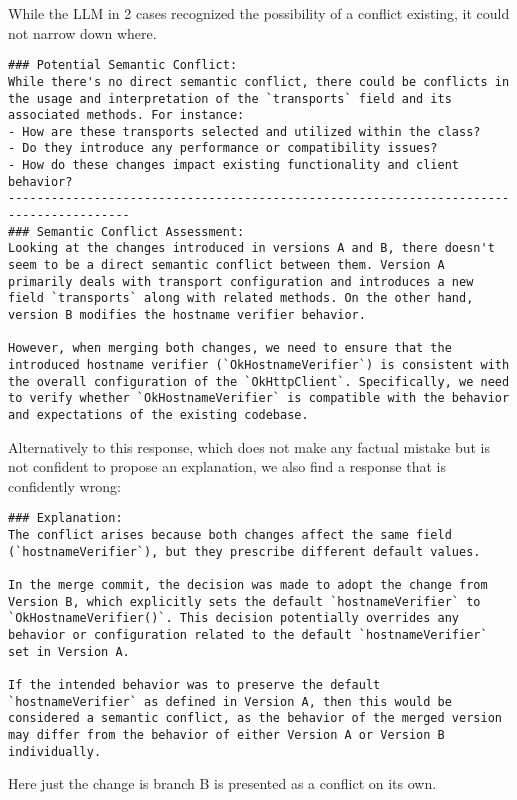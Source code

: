 While the LLM in 2 cases recognized the possibility of a conflict existing, it could not narrow down where.
\begin{lstlisting}
### Potential Semantic Conflict:
While there's no direct semantic conflict, there could be conflicts in the usage and interpretation of the `transports` field and its associated methods. For instance:
- How are these transports selected and utilized within the class?
- Do they introduce any performance or compatibility issues?
- How do these changes impact existing functionality and client behavior?
---------------------------------------------------------------------------------------
### Semantic Conflict Assessment:
Looking at the changes introduced in versions A and B, there doesn't seem to be a direct semantic conflict between them. Version A primarily deals with transport configuration and introduces a new field `transports` along with related methods. On the other hand, version B modifies the hostname verifier behavior.

However, when merging both changes, we need to ensure that the introduced hostname verifier (`OkHostnameVerifier`) is consistent with the overall configuration of the `OkHttpClient`. Specifically, we need to verify whether `OkHostnameVerifier` is compatible with the behavior and expectations of the existing codebase.
\end{lstlisting}
Alternatively to this response, which does not make any factual mistake but is not confident to propose an explanation, we also find a response that is confidently wrong:
\begin{lstlisting}
### Explanation:
The conflict arises because both changes affect the same field (`hostnameVerifier`), but they prescribe different default values.
   
In the merge commit, the decision was made to adopt the change from Version B, which explicitly sets the default `hostnameVerifier` to `OkHostnameVerifier()`. This decision potentially overrides any behavior or configuration related to the default `hostnameVerifier` set in Version A.
    
If the intended behavior was to preserve the default `hostnameVerifier` as defined in Version A, then this would be considered a semantic conflict, as the behavior of the merged version may differ from the behavior of either Version A or Version B individually.
\end{lstlisting}
Here just the change is branch B is presented as a conflict on its own.


